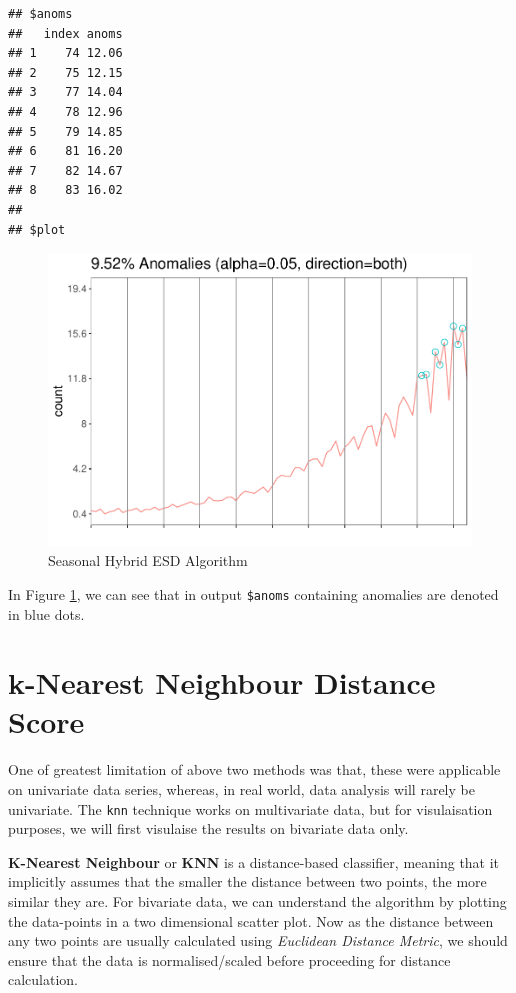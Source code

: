 \documentclass[
]{book}
\begin{document}
\begin{verbatim}
## $anoms
##   index anoms
## 1    74 12.06
## 2    75 12.15
## 3    77 14.04
## 4    78 12.96
## 5    79 14.85
## 6    81 16.20
## 7    82 14.67
## 8    83 16.02
## 
## $plot
\end{verbatim}

\begin{figure}

{\centering \includegraphics[height=0.28\textheight]{DauR_files/figure-latex/an4-1} 

}

\caption{Seasonal Hybrid ESD Algorithm}\label{fig:an4}
\end{figure}

In Figure \ref{fig:an4}, we can see that in output \texttt{\$anoms} containing anomalies are denoted in blue dots.

\hypertarget{k-nearest-neighbour-distance-score}{%
\section{k-Nearest Neighbour Distance Score}\label{k-nearest-neighbour-distance-score}}

One of greatest limitation of above two methods was that, these were applicable on univariate data series, whereas, in real world, data analysis will rarely be univariate. The \texttt{knn} technique works on multivariate data, but for visulaisation purposes, we will first visulaise the results on bivariate data only.

\textbf{K-Nearest Neighbour} or \textbf{KNN} is a distance-based classifier, meaning that it implicitly assumes that the smaller the distance between two points, the more similar they are. For bivariate data, we can understand the algorithm by plotting the data-points in a two dimensional scatter plot. Now as the distance between any two points are usually calculated using \emph{Euclidean Distance Metric}, we should ensure that the data is normalised/scaled before proceeding for distance calculation.
\end{document}
